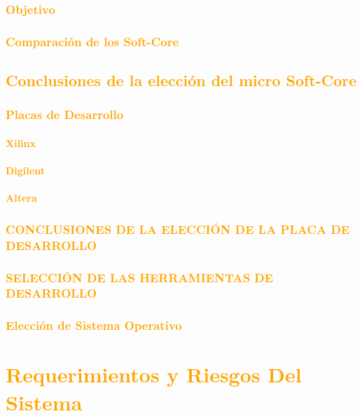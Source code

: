 \documentclass[a4paper,11pt]{article}
\begin{document}
		\subsubsection{\textcolor{orange}{Objetivo}} 	 
		\subsubsection{\textcolor{orange}{Comparación de los Soft-Core}} 
	 	\subsection{\textcolor{orange}{Conclusiones de la elección del micro Soft-Core}}
 		\subsubsection{\textcolor{orange}{Placas de Desarrollo}}
			\paragraph{\textcolor{orange}{Xilinx}}
			\paragraph{\textcolor{orange}{Digilent}} 	 
			\paragraph{\textcolor{orange}{Altera}}
 		\subsubsection{\textcolor{orange}{CONCLUSIONES DE LA ELECCIÓN DE LA PLACA DE DESARROLLO}}
 		\subsubsection{\textcolor{orange}{SELECCIÓN DE LAS HERRAMIENTAS DE DESARROLLO}} 	 
 		\subsubsection{\textcolor{orange}{Elección de Sistema Operativo}}
			
\section{\textcolor{orange}{Requerimientos y Riesgos Del Sistema}}
\end{document}
